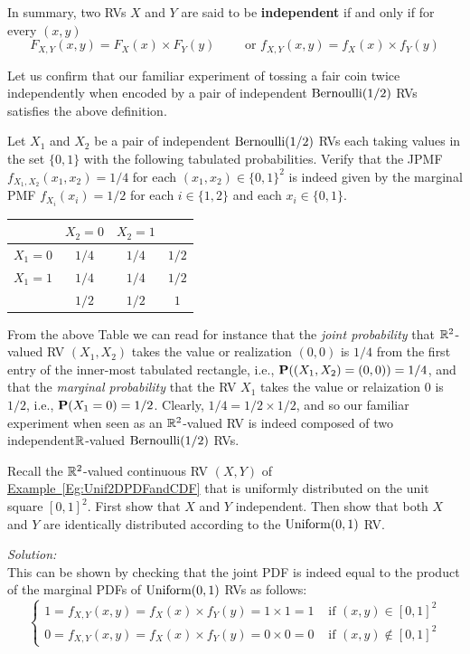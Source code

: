 In summary, two RVs $X$ and $Y$ are said to be {\bf independent} if and only if for every $(x,y)$
\[
\boxed{
F_{X,Y}(x,y) = F_X(x) \times F_Y(y) \qquad \text{ or } f_{X,Y}(x,y) = f_X(x) \times f_Y(y)
}
\]

Let us confirm that our familiar experiment of tossing a fair coin twice independently when encoded by a pair of independent $\mbox{{\rm Bernoulli}}(1/2)$ RVs satisfies the above definition.

\begin{example}\label{EgIndepPairOfBernoulis}
Let $X_1$ and $X_2$ be a pair of independent $\mbox{{\rm Bernoulli}}(1/2)$ RVs each taking values in the set $\{0,1\}$ with the following tabulated probabilities. Verify that the JPMF $f_{X_1,X_2}(x_1,x_2)=1/4$ for each $(x_1,x_2) \in \{0,1\}^2$ is indeed given by the marginal PMF $f_{X_i}(x_i)=1/2$ for each $i \in \{1,2\}$ and each $x_i \in \{0,1\}$.

\begin{center}
\begin{tabular}{|c|c c|c|}
\hline
& $X_2=0$ & $X_2=1$ & \\ \hline
$X_1=0$& $1/4$ & $1/4$ & $1/2$ \\
$X_1=1$& $1/4$ & $1/4$ & $1/2$ \\ \hline
& $1/2$ & $1/2$ & $1$\\ \hline
\end{tabular}
\end{center}
From the above Table we can read for instance that the {\em joint probability} that $\mathbb{R}^2$-valued RV $(X_1,X_2)$ takes the value or realization $(0,0)$ is $1/4$ from the first entry of the inner-most tabulated rectangle, 
i.e., $\mathbf{P}((X_1,X_2)=(0,0))=1/4$, 
and that the {\em marginal probability} that the RV $X_1$ takes the value or relaization $0$ is $1/2$, 
i.e., $\mathbf{P}(X_1=0)=1/2$. 
Clearly, $1/4=1/2 \times 1/2$, and so our familiar experiment when seen as an $\mathbb{R}^2$-valued RV is indeed composed of two independent$\mathbb{R}$-valued $\mbox{{\rm Bernoulli}}(1/2)$ RVs. 
\end{example}

\begin{example}\label{EgShowIndepUnifDensityOnUnitSquare}
Recall the $\mathbb{R}^2$-valued continuous RV $(X,Y)$ of \hyperref[Eg:Unif2DPDFandCDF]{Example~\ref*{Eg:Unif2DPDFandCDF}} 
that is uniformly distributed on the unit square $[0,1]^2$. 
First show that $X$ and $Y$ independent. 
Then show that both $X$ and $Y$ are identically distributed according to the $\mbox{{\rm Uniform}}(0,1)$ RV. 

{\em Solution:}\\[4pt]
This can be shown by checking that the joint PDF is indeed equal to the product of the marginal PDFs of $\mbox{{\rm Uniform}}(0,1)$ RVs as follows:
\[
\begin{cases}
1= f_{X,Y}(x,y) =  f_X(x) \times f_Y(y) = 1 \times 1 = 1 & \text{ if } (x,y) \in [0,1]^2\\
0= f_{X,Y}(x,y) =  f_X(x) \times f_Y(y) = 0 \times 0 = 0 & \text{ if } (x,y) \notin [0,1]^2
\end{cases}
\]
\end{example}

